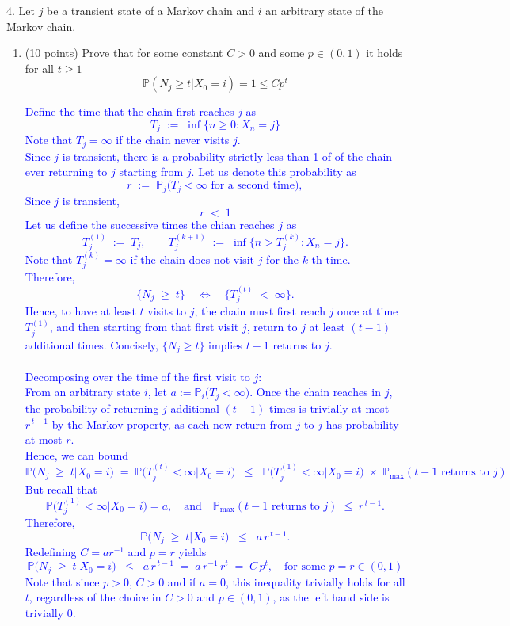 \documentclass{article}
\begin{document}
\begin{enumerate}[label=(\alph*)]
\end{enumerate}

4. Let $j$ be a transient state of a Markov chain and $i$ an arbitrary state of the Markov chain.
 
\begin{enumerate}[label=(\alph*)]
    \item (10 points) Prove that for some constant $C > 0$ and some $p \in (0,1)$ it holds for all $t \geq 1$
\[
\mathbb{P}(N_j \geq t | X_0 = i) = 1 \leq C p^t
\]

\textcolor{blue}{
    Define the time that the chain first reaches $j$ as
\[
T_j \;:=\; \inf\{n \ge 0 : X_n = j\}
\]
Note that $T_j = \infty$ if the chain never visits $j$. \\
Since $j$ is transient, there is a probability strictly less than 1 of of the chain ever returning to $j$ starting from $j$. Let us denote this probability as 
\[
r \;:=\; \mathbb{P}_j\bigl(T_j < \infty\text{ for a second time}\bigr),
\]
Since $j$ is transient,
\[
r \;<\; 1
\]
Let us define the successive times the chian reaches $j$ as
\[
T_j^{(1)} 
\;:=\; T_j,
\qquad
T_j^{(k+1)}
\;:=\; \inf\{ n > T_j^{(k)} : X_n = j \}.
\]
Note that $T_j^{(k)} = \infty$ if the chain does not visit $j$ for the $k$-th time. \\
Therefore,
\[
\{N_j \;\ge\; t\}
\quad\Leftrightarrow\quad
\{ T_j^{(t)} \;<\;\infty \}.
\]
Hence, to have at least $t$ visits to $j$, the chain must first reach $j$ once at  time $T_j^{(1)}$, and then 
starting from that first visit $j$, return to $j$ at least $(t-1)$ additional times. 
Concisely, $\{N_j \ge t\}$ implies $t-1$ returns to $j$. \\ \\
Decomposing over the time of the first visit to $j$: \\
From an arbitrary state $i$, let $a := \mathbb{P}_i\bigl(T_j < \infty\bigr)$.
Once the chain reaches in $j$, the probability of returning $j$ additional $(t-1)$ times is trivially at most $r^{\,t-1}$ by the Markov property, as each new return from $j$ to $j$ has probability at most $r$.  \\
Hence, we can bound
\[
\mathbb{P}\bigl(N_j \;\ge\; t\bigr | X_0 = i)
\;=\;
\mathbb{P}\bigl(T_j^{(t)} < \infty\bigr | X_0 = i)
\;\;\le\;\;
\mathbb{P}\bigl(T_j^{(1)} < \infty\bigr | X_0 = i)
\;\times\; \mathbb{P}_{\text{max}}(t-1\text{ returns to } j)
\]
But recall that 
\[
\mathbb{P}\bigl(T_j^{(1)} < \infty\bigr | X_0 = i) = a,
\quad\text{and}\quad
\mathbb{P}_{\text{max}}(t-1\text{ returns to } j)
\;\le\;
r^{\,t-1}.
\]
Therefore,
\[
\mathbb{P}\bigl(N_j \;\ge\; t\bigr | X_0 = i)
\;\;\le\;\;
a \, r^{\,t-1}.
\]
Redefining $C = ar^{-1}$ and $p = r$ yields
\[
\mathbb{P}\bigl(N_j \;\ge\; t\bigr | X_0 = i)
\;\;\le\;\;
a \, r^{\,t-1}
\;=\;
a\,r^{-1}\,r^t
\;=\;
C\,p^t,
\quad
\text{for some } p = r \in (0,1)
\]
Note that since $p > 0$, $C>0$ and if $a=0$, this inequality trivially holds for all $t$, regardless of the choice in $C>0$ and $p \in (0,1)$, as the left hand side is trivially 0. 
}


\end{enumerate}
\end{document}
